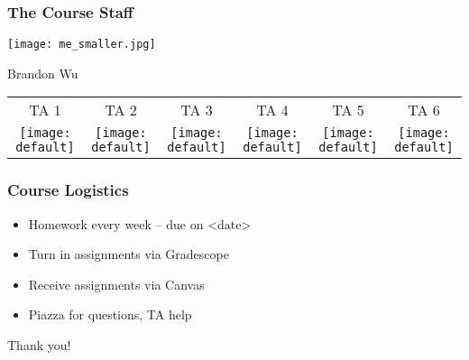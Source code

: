 \documentclass[aspectratio=169]{beamer}
\begin{document}
\begin{frame}[fragile]
    \frametitle{The Course Staff}

    \begin{center} \texttt{[image: me\_smaller.jpg]} \end{center}
    \begin{center} \Large Brandon Wu \end{center}
    
    \vspace{\fill}

    \begin{center}\begin{tabular}{c c c c c c}
      TA 1 & TA 2 & TA 3 & TA 4 & TA 5 & TA 6 \\  
      \texttt{[image: default]} &
      \texttt{[image: default]} &
      \texttt{[image: default]} &
      \texttt{[image: default]} &
      \texttt{[image: default]} &
      \texttt{[image: default]} \\
    \end{tabular}\end{center}

\end{frame}


\begin{frame}[fragile]
    \frametitle{Course Logistics}

    \begin{itemize}
      \item Homework every week -- due on <date>
      \item Turn in assignments via Gradescope
      \item Receive assignments via Canvas
      \item Piazza for questions, TA help
    \end{itemize}

\end{frame}

\begin{frame}[plain]
	\begin{center} Thank you! \end{center}
\end{frame}
\end{document}
